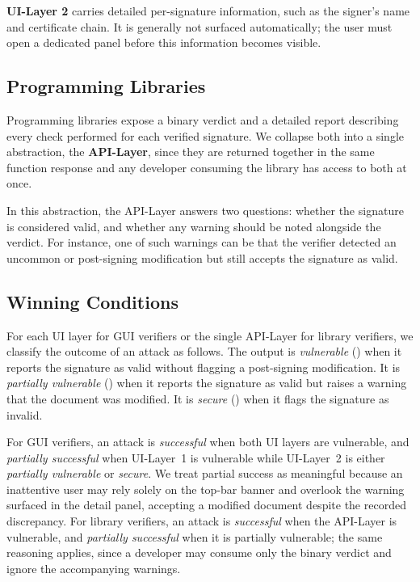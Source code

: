 \documentclass[12pt]{article}
\begin{document}
\textbf{UI-Layer 2} carries detailed per-signature information, such as the signer's name and certificate chain. It is generally not surfaced automatically; the user must open a dedicated panel before this information becomes visible.

\subsection{Programming Libraries}

Programming libraries expose a binary verdict and a detailed report describing every check performed for each verified signature. We collapse both into a single abstraction, the \textbf{API-Layer}, since they are returned together in the same function response and any developer consuming the library has access to both at once.

In this abstraction, the API-Layer answers two questions: whether the signature is considered valid, and whether any warning should be noted alongside the verdict. For instance, one of such warnings can be that the verifier detected an uncommon or post-signing modification but still accepts the signature as valid.

\subsection{Winning Conditions} \label{sec:winning-conditions}

For each UI layer for GUI verifiers or the single API-Layer for library verifiers, we classify the outcome of an attack as follows. The output is \emph{vulnerable} (\CIRCLE) when it reports the signature as valid without flagging a post-signing modification. It is \emph{partially vulnerable} (\LEFTcircle) when it reports the signature as valid but raises a warning that the document was modified. It is \emph{secure} (\Circle) when it flags the signature as invalid.

For GUI verifiers, an attack is \emph{successful} when both UI layers are vulnerable, and \emph{partially successful} when UI-Layer~1 is vulnerable while UI-Layer~2 is either \emph{partially vulnerable} or \emph{secure}. We treat partial success as meaningful because an inattentive user may rely solely on the top-bar banner and overlook the warning surfaced in the detail panel, accepting a modified document despite the recorded discrepancy. For library verifiers, an attack is \emph{successful} when the API-Layer is vulnerable, and \emph{partially successful} when it is partially vulnerable; the same reasoning applies, since a developer may consume only the binary verdict and ignore the accompanying warnings.
\end{document}
